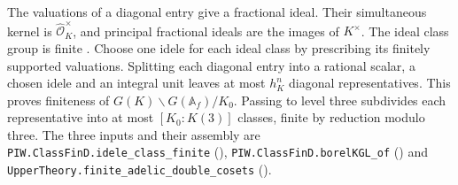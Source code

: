 The valuations of a diagonal entry give a fractional ideal. Their simultaneous kernel is $\widehat{\mathcal O}_K^\times$, and principal fractional ideals are the images of $K^\times$. The ideal class group is finite \cite[Theorem 4.4]{P-R3-ANT}. Choose one idele for each ideal class by prescribing its finitely supported valuations. Splitting each diagonal entry into a rational scalar, a chosen idele and an integral unit leaves at most $h_K^n$ diagonal representatives. This proves finiteness of $G(K)\backslash G(\mathbb A_f)/K_0$. Passing to level three subdivides each representative into at most $[K_0:K(3)]$ classes, finite by reduction modulo three. The three inputs and their assembly are \nolinkurl{PIW.ClassFinD.idele_class_finite} (), \nolinkurl{PIW.ClassFinD.borelKGL_of} () and \nolinkurl{UpperTheory.finite_adelic_double_cosets} ().

